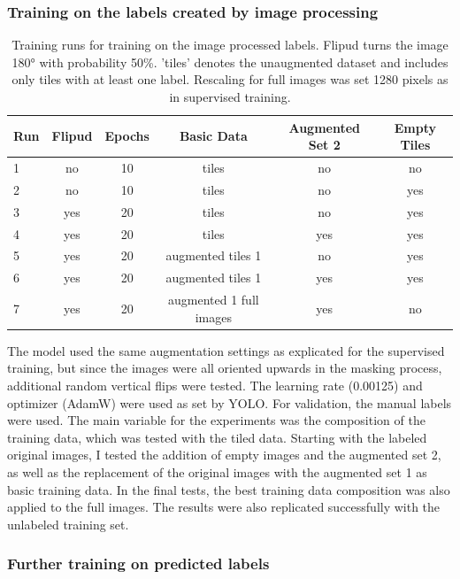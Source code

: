 \documentclass[12pt, a4paper]{article}
\begin{document}
\subsubsection{Training on the labels created by image processing}

\begin{table}[!t]
    \centering
    \begin{tabular}{lccccc}
        \toprule
        Run & Flipud & Epochs & Basic Data & Augmented Set 2 & Empty Tiles   \\
        \midrule
        1 & no & 10 & tiles & no & no\\
        2 & no & 10 & tiles& no & yes \\
        3 & yes & 20 & tiles & no & yes \\
        4 & yes & 20 & tiles & yes & yes \\
        5 & yes & 20 & augmented tiles 1 & no & yes \\
        6 & yes & 20 & augmented tiles 1 & yes & yes\\
        7 & yes & 20 & augmented 1 full images & yes & no\\ 
        \bottomrule
    \end{tabular}
    \caption{Training runs for training on the image processed labels. Flipud turns the image 180° with probability 50\%. 'tiles' denotes the unaugmented dataset and includes only tiles with at least one label. Rescaling for full images was set 1280 pixels as in supervised training.}
    \label{tab:train_on_created_labels}
\end{table}

The model used the same augmentation settings as explicated for the supervised training, but since the images were all oriented upwards in the masking process, additional random vertical flips were tested. The learning rate (0.00125) and optimizer (AdamW) were used as set by YOLO. For validation, the manual labels were used. The main variable for the experiments was the composition of the training data, which was tested with the tiled data. Starting with the labeled original images, I tested the addition of empty images and the augmented set 2, as well as the replacement of the original images with the augmented set 1 as basic training data. In the final tests, the best training data composition was also applied to the full images. The results were also replicated successfully with the unlabeled training set.

\subsubsection{Further training on predicted labels}
\end{document}
